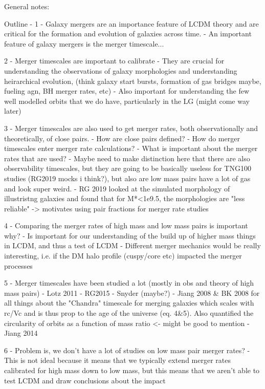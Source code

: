 General notes:

Outline - 
1 - Galaxy mergers are an importance feature of LCDM theory and are critical for the formation and evolution of galaxies across time. 
    - An important feature of galaxy mergers is the merger timescale...

2 - Merger timescales are important to calibrate 
    - They are crucial for understanding the observations of galaxy morphologies and understanding heirarchical evolution, (think galaxy start bursts, formation of gas bridges maybe, fueling agn, BH merger rates, etc)
    - Also important for understanding the few well modelled orbits that we do have, particularly in the LG (might come way later) 

3 - Merger timescales are also used to get merger rates, both observationally and theoretically, of close pairs.
    - How are close pairs defined? 
    - How do merger timescales enter merger rate calculations?
    - What is important about the merger rates that are used? 
    - Maybe need to make distinction here that there are also observability timescales, but they are going to be basically useless for TNG100 studies (RG2019 mocks i think?), but also are low mass pairs have a lot of gas and look super weird. 
    - RG 2019 looked at the simulated morphology of illustristng galaxies and found that for M*<1e9.5, the morphologies are "less reliable" -> motivates using pair fractions for merger rate studies 


4 - Comparing the merger rates of high mass and low mass pairs is important why?
    - Is important for our understanding of the build up of higher mass things in LCDM, and thus a test of LCDM
    - Different merger mechanics would be really interesting, i.e. if the DM halo profile (cuspy/core etc) impacted the merger processes

5 - Merger timescales have been studied a lot (mostly in obs and theory of high mass pairs)
    - Lotz 2011
    - RG2015
    - Snyder (maybe?) 
    - Jiang 2008 & BK 2008 for all things about the "Chandra" timescale for merging galaxies which scales with rc/Vc and is thus prop to the age of the universe (eq. 4\&5). Also quantified the circularity of orbits as a function of mass ratio <- might be good to mention
    - Jiang 2014 

    
6 - Problem is, we don't have a lot of studies on low mass pair merger rates? 
    - This is not ideal because it means that we typically extend merger rates calibrated for high mass down to low mass, but this means that we aren't able to test LCDM and draw conclusions about the impact

